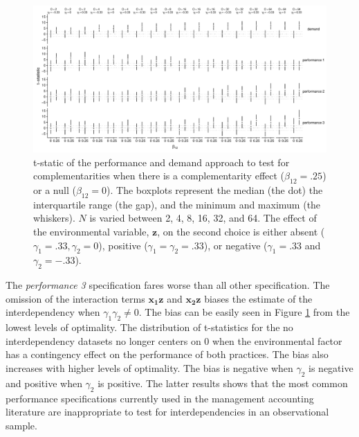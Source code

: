 \documentclass[12pt]{article}
\begin{document}
\begin{figure}
\includegraphics[width=450px]{figure-latex/main_plot.pdf}
\caption[Error Rate and Power of Demand and Performance Specification]
{\label{main} t-static of the performance and demand approach to test
for complementarities when there is a complementarity effect ($\beta_{12} = .25$)
or a null ($\beta_{12} = 0$). The boxplots represent the median (the dot) the
interquartile range (the gap), and the minimum and maximum (the whiskers). $N$
is varied between 2, 4, 8, 16, 32, and 64. The effect of the environmental
variable, $\mathbf{z}$, on the second choice is either absent 
($\gamma_1 = .33,  \gamma_2 = 0$), positive ($\gamma_1 = \gamma_2 = .33$), or negative ($\gamma_1 = .33$ and $\gamma_2 = -.33$).}
\end{figure}


The \emph{performance 3}  specification fares worse than all other specification. The omission of the interaction terms \(\mathbf{x_1z}\) and \(\mathbf{x_2z}\) biases the estimate of the interdependency when $\gamma_1 \gamma_2 \neq 0$. The bias can be easily seen in Figure \ref{main} from the lowest levels of optimality. The distribution of t-statistics for the no interdependency datasets no longer centers on $0$ when the environmental factor has a contingency effect on the performance of both practices. The bias also increases with higher levels of optimality. The bias is negative when $\gamma_2$ is negative and positive when $\gamma_2$ is positive.  The latter results shows that the most common performance specifications currently used in the management accounting literature are inappropriate to test for interdependencies in an observational sample.


\end{document}

